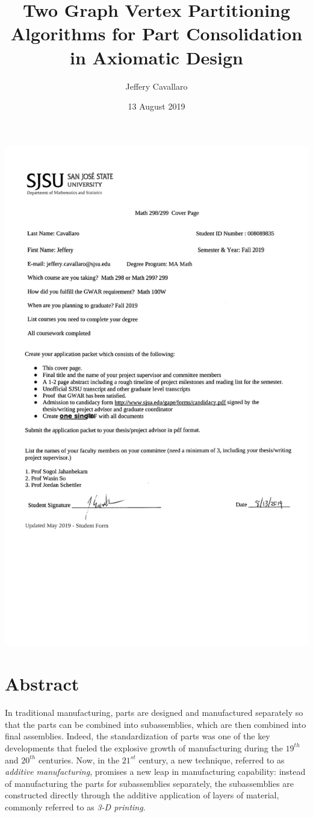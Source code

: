 \documentclass[letterpaper,12pt]{article}
\begin{document}
\hspace*{-1in}
\includegraphics[scale=0.9]{CoverPage.jpg}

\title{Two Graph Vertex Partitioning Algorithms for Part Consolidation in Axiomatic Design}
\author{Jeffery Cavallaro}
\date{13 August 2019}
\maketitle
\section*{Abstract}
In traditional manufacturing, parts are designed and manufactured separately so that the parts can be combined into
subassemblies, which are then combined into final assemblies.  Indeed, the standardization of parts was one of the key
developments that fueled the explosive growth of manufacturing during the \(19^{th}\) and \(20^{th}\) centuries.  Now, in the
\(21^{st}\) century, a new technique, referred to as \emph{additive manufacturing}, promises a new leap in manufacturing
capability: instead of manufacturing the parts for subassemblies separately, the subassemblies are constructed directly
through the additive application of layers of material, commonly referred to as \emph{3-D printing}.
\end{document}
